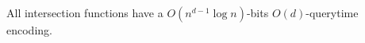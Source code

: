 \begin{lemma}[%
  label=thm:intersection-d,%
  restate=TheoremGPTIntersectionD%
]
  All intersection functions have a
  \(O(n^{d-1} \log n)\)-bits
  \(O(d)\)-querytime
  encoding.
\end{lemma}
